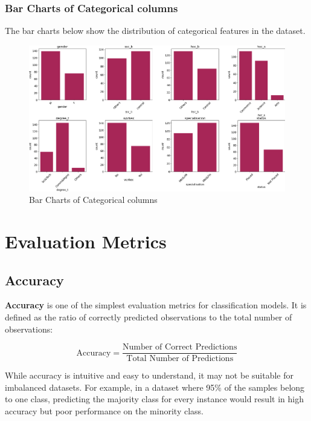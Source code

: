 \documentclass{article}%
\begin{document}
%
\newpage%
\subsubsection{Bar Charts of Categorical columns}%
\label{ssubsec:BarChartsofCategoricalcolumns}%
The bar charts below show the distribution of categorical features in the dataset.%


\begin{figure}[h!]%
\centering%
\includegraphics[width=460px]{EDA/bar_charts.png}%
\caption{Bar Charts of Categorical columns}%
\end{figure}

%
\newpage%
\section{Evaluation Metrics}%
\label{sec:EvaluationMetrics}%
\subsection{Accuracy}%
\label{subsec:Accuracy}%

                \textbf{Accuracy} is one of the simplest evaluation metrics for classification models. 
                It is defined as the ratio of correctly predicted observations to the total number of observations:

                \[
                \text{Accuracy} = \frac{\text{Number of Correct Predictions}}{\text{Total Number of Predictions}}
                \]

                While accuracy is intuitive and easy to understand, it may not be suitable for imbalanced datasets. 
                For example, in a dataset where 95\% of the samples belong to one class, predicting the majority class for every instance 
                would result in high accuracy but poor performance on the minority class.
                
\end{document}
